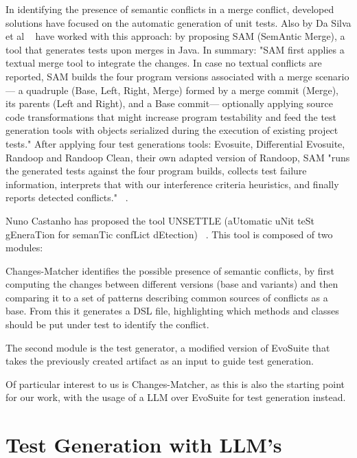 In identifying the presence of semantic conflicts in a merge conflict, developed solutions have focused on the automatic generation of unit tests. Also by Da Silva et al ~\citep{kn:leuson2} have worked with this approach: by proposing SAM (SemAntic Merge), a tool that generates tests upon merges in Java. In summary: "SAM first applies a textual merge tool to integrate the changes. In
case no textual conflicts are reported, SAM builds the four program versions
associated with a merge scenario— a quadruple (Base, Left, Right, Merge)
formed by a merge commit (Merge), its parents (Left and Right), and a Base
commit— optionally applying source code transformations that might increase
program testability and feed the test generation tools with objects serialized
during the execution of existing project tests." After applying four test generations tools: Evosuite, Differential Evosuite, Randoop and Randoop Clean, their own adapted version of Randoop, SAM "runs the generated tests against the four program builds, collects test failure information, interprets
that with our interference criteria heuristics, and finally reports detected
conflicts." ~\citep{kn:leuson2}.

Nuno Castanho has proposed the tool UNSETTLE (aUtomatic uNit teSt gEneraTion for semanTic confLict dEtection) ~\citep{kn:nuno}. This tool is composed of two modules:

Changes-Matcher identifies the possible presence of semantic conflicts, by first computing the changes between different versions (base and variants) and then comparing it to a set of patterns describing common sources of conflicts as a base. From this it generates a DSL file, highlighting which methods and classes should be put under test to identify the conflict.

The second module is the test generator, a modified version of EvoSuite that takes the previously created artifact as an input to guide test generation.

Of particular interest to us is Changes-Matcher, as this is also the starting point for our work, with the usage of a LLM over EvoSuite for test generation instead.

\section{Test Generation with LLM's}

